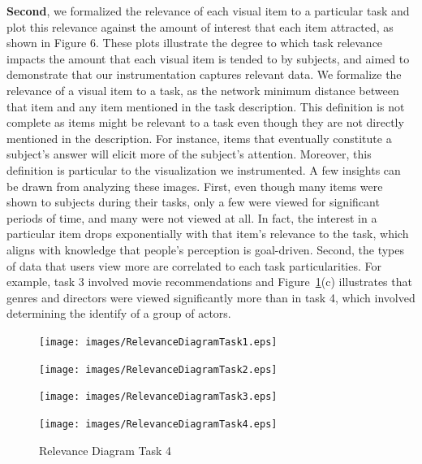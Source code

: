 \textbf{Second}, we formalized the relevance of each visual item to a particular task and plot this relevance against the amount of interest that each item attracted, as shown in Figure 6. These plots illustrate the degree to which task relevance impacts the amount that each visual item is tended to by subjects, and aimed to demonstrate that our instrumentation captures relevant data.  
We formalize the relevance of a visual item to a task, as the network minimum distance between that item and any item mentioned in the task description.  This definition is not complete as items might be relevant to a task even though they are not directly mentioned in the description.  For instance, items that eventually constitute a subject's answer will elicit more of the subject's attention. Moreover, this definition is particular to the visualization we instrumented.
A few insights can be drawn from analyzing these images. First, even though many items were shown to subjects during their tasks, only a few were viewed for significant periods of time, and many were not viewed at all. In fact, the interest in a particular item drops exponentially with that item's relevance to the task, which aligns with knowledge that people's perception is goal-driven.  Second, the types of data that users view more are correlated to each task particularities. For example, task 3 involved movie recommendations and Figure~\ref{fig:RelevanceDiagram}(c) illustrates that genres and directors were viewed significantly more than in task 4, which involved determining the identify of a group of actors. 



\begin{figure}[!hbt]
  \centering
  \texttt{[image: images/RelevanceDiagramTask1.eps]}
	\caption*{Relevance Diagram Task 1}
	\texttt{[image: images/RelevanceDiagramTask2.eps]}
	\caption*{Relevance Diagram Task 2}
	\texttt{[image: images/RelevanceDiagramTask3.eps]}
	\caption*{Relevance Diagram Task 3}
	\texttt{[image: images/RelevanceDiagramTask4.eps]}
	\caption*{Relevance Diagram Task 4}
	\label{fig:RelevanceDiagram}
\end{figure}


